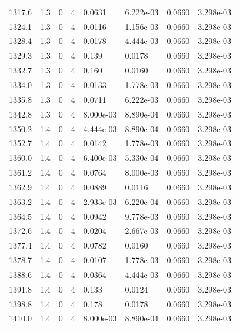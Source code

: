 \documentclass[preview]{standalone}
\begin{document}
{{{{{{{{\begin{tabular}{L{1.2cm}C{1.2cm} C{0.3cm}C{0.5cm} C{1.4cm}C{1.4cm} C{1.4cm}C{1.4cm}}
  1317.6  &   1.3  & 0     &  4 &  0.0631  & 6.222e-03  & 0.0660 &  3.298e-03   \\ 
  1324.1  &   1.3  & 0     &  4 &  0.0116  & 1.156e-03  & 0.0660 &  3.298e-03   \\ 
  1328.4  &   1.3  & 0     &  4 &  0.0178  & 4.444e-03  & 0.0660 &  3.298e-03   \\ 
  1329.3  &   1.3  & 0     &  4 &  0.139  & 0.0178  & 0.0660 &  3.298e-03   \\ 
  1332.7  &   1.3  & 0     &  4 &  0.160  & 0.0160  & 0.0660 &  3.298e-03   \\ 
  1334.0  &   1.3  & 0     &  4 &  0.0133  & 1.778e-03  & 0.0660 &  3.298e-03   \\ 
  1335.8  &   1.3  & 0     &  4 &  0.0711  & 6.222e-03  & 0.0660 &  3.298e-03   \\ 
  1342.8  &   1.3  & 0     &  4 &  8.000e-03  & 8.890e-04  & 0.0660 &  3.298e-03   \\ 
  1350.2  &   1.4  & 0     &  4 &  4.444e-03  & 8.890e-04  & 0.0660 &  3.298e-03   \\ 
  1352.7  &   1.4  & 0     &  4 &  0.0142  & 1.778e-03  & 0.0660 &  3.298e-03   \\ 
  1360.0  &   1.4  & 0     &  4 &  6.400e-03  & 5.330e-04  & 0.0660 &  3.298e-03   \\ 
  1361.2  &   1.4  & 0     &  4 &  0.0764  & 8.000e-03  & 0.0660 &  3.298e-03   \\ 
  1362.9  &   1.4  & 0     &  4 &  0.0889  & 0.0116  & 0.0660 &  3.298e-03   \\ 
  1363.2  &   1.4  & 0     &  4 &  2.933e-03  & 6.220e-04  & 0.0660 &  3.298e-03   \\ 
  1364.5  &   1.4  & 0     &  4 &  0.0942  & 9.778e-03  & 0.0660 &  3.298e-03   \\ 
  1372.6  &   1.4  & 0     &  4 &  0.0204  & 2.667e-03  & 0.0660 &  3.298e-03   \\ 
  1377.4  &   1.4  & 0     &  4 &  0.0782  & 0.0160  & 0.0660 &  3.298e-03   \\ 
  1378.7  &   1.4  & 0     &  4 &  0.0107  & 1.778e-03  & 0.0660 &  3.298e-03   \\ 
  1388.6  &   1.4  & 0     &  4 &  0.0364  & 4.444e-03  & 0.0660 &  3.298e-03   \\ 
  1391.8  &   1.4  & 0     &  4 &  0.133  & 0.0124  & 0.0660 &  3.298e-03   \\ 
  1398.8  &   1.4  & 0     &  4 &  0.178  & 0.0178  & 0.0660 &  3.298e-03   \\ 
  1410.0  &   1.4  & 0     &  4 &  8.000e-03  & 8.890e-04  & 0.0660 &  3.298e-03   \\ 

\end{tabular}}}}}}}}}
\end{document}
